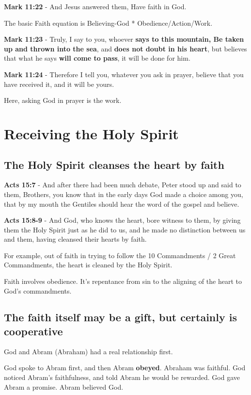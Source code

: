 \documentclass[11pt]{article}
\begin{document}
\textbf{Mark 11:22} - And Jesus answered them, Have faith in God.

The basic Faith equation is Believing-God * Obedience/Action/Work.

\textbf{Mark 11:23} - Truly, I say to you, whoever \textbf{says to this mountain, Be taken up and thrown into the sea}, and \textbf{does not doubt in his heart}, but believes that what he says \textbf{will come to pass}, it will be done for him.

\textbf{Mark 11:24} - Therefore I tell you, whatever you ask in prayer, believe that you have received it, and it will be yours.

Here, asking God in prayer is the work.

\section{Receiving the Holy Spirit}
\label{sec:org3473e9e}
\subsection{The Holy Spirit cleanses the heart by faith}
\label{sec:org35b67ff}
\textbf{Acts 15:7} - And after there had been much debate, Peter stood up and said to them, Brothers, you know that in the early days God made a choice among you, that by my mouth the Gentiles should hear the word of the gospel and believe.

\textbf{Acts 15:8-9} - And God, who knows the heart, bore witness to them, by giving them the Holy Spirit just as he did to us, and he made no distinction between us and them, having cleansed their hearts by faith.

For example, out of faith in trying to follow the 10 Commandments / 2 Great Commandments, the heart is cleaned by the Holy Spirit.

Faith involves obedience. It's repentance from sin to the aligning of the heart to God's commandments.

\subsection{The faith itself may be a gift, but certainly is cooperative}
\label{sec:orga9264df}
God and Abram (Abraham) had a real relationship first.

God spoke to Abram first, and then Abram \textbf{obeyed}.
Abraham was faithful.
God noticed Abram's faithfulness, and told Abram he would be rewarded.
God gave Abram a promise.
Abram believed God.
\end{document}
